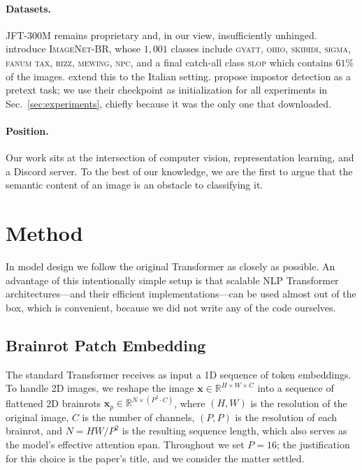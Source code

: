 \documentclass[10pt]{article}
\newcommand{\br}{\textsc{ImageNet-BR}}
\begin{document}
\paragraph{Datasets.}
JFT-300M remains proprietary and, in our view, insufficiently unhinged.
\citet{ohio2024dataset} introduce \br{}, whose $1{,}001$ classes include
\textsc{gyatt}, \textsc{ohio}, \textsc{skibidi}, \textsc{sigma},
\textsc{fanum tax}, \textsc{rizz}, \textsc{mewing}, \textsc{npc}, and a final
catch-all class \textsc{slop} which contains $61\%$ of the images.
\citet{bombardiro2024crocodilo} extend this to the Italian setting.
\citet{sus2020amogus} propose impostor detection as a pretext task; we use
their checkpoint as initialization for all experiments in
Sec.~\ref{sec:experiments}, chiefly because it was the only one that downloaded.

\paragraph{Position.}
Our work sits at the intersection of computer vision, representation learning,
and a Discord server. To the best of our knowledge, we are the first to argue
that the semantic content of an image is an obstacle to classifying it.

\section{Method}
\label{sec:method}

In model design we follow the original Transformer \citep{vasqwanti2017attention}
as closely as possible. An advantage of this intentionally simple setup is that
scalable NLP Transformer architectures---and their efficient
implementations---can be used almost out of the box, which is convenient,
because we did not write any of the code ourselves.

\subsection{Brainrot Patch Embedding}
\label{sec:patch}

The standard Transformer receives as input a 1D sequence of token embeddings.
To handle 2D images, we reshape the image
$\mathbf{x} \in \mathbb{R}^{H \times W \times C}$ into a sequence of flattened
2D brainrots $\mathbf{x}_p \in \mathbb{R}^{N \times (P^2 \cdot C)}$, where
$(H,W)$ is the resolution of the original image, $C$ is the number of channels,
$(P,P)$ is the resolution of each brainrot, and
$N = HW/P^{2}$ is the resulting sequence length, which also serves as the
model's effective attention span. Throughout we set $P=16$; the justification
for this choice is the paper's title, and we consider the matter settled.
\end{document}
